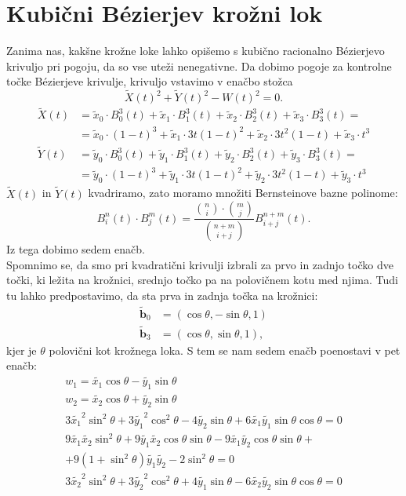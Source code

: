\documentclass[a4paper,11pt]{article}
\theoremstyle{definition}
\theoremstyle{plain}
\begin{document}
\section{Kubični B\'ezierjev krožni lok}


Zanima nas, kakšne krožne loke lahko opišemo s kubično racionalno B\'ezierjevo krivuljo pri pogoju, da so vse uteži nenegativne. Da dobimo pogoje za kontrolne točke B\'ezierjeve krivulje, krivuljo vstavimo v enačbo stožca
$$ \tilde{X}(t)^2+\tilde{Y}(t)^2-W(t)^2=0.$$
\begin{align*}
\tilde{X}(t) &= \tilde{x}_0\cdot B_0^3(t)+\tilde{x}_1\cdot B_1^3(t)+ \tilde{x}_2\cdot B_2^3(t) + \tilde{x}_3\cdot B_3^3(t) = \\
&= \tilde{x}_0\cdot (1-t)^3+\tilde{x}_1\cdot3t(1-t)^2+\tilde{x}_2\cdot3t^2(1-t)+\tilde{x}_3\cdot t^3 \\
\tilde{Y}(t) &=\tilde{y}_0\cdot B_0^3(t)+\tilde{y}_1\cdot B_1^3(t)+\tilde{y}_2\cdot B_2^3(t) + \tilde{y}_3\cdot B_3^3(t) = \\
&= \tilde{y}_0\cdot (1-t)^3+\tilde{y}_1\cdot3t(1-t)^2+\tilde{y}_2\cdot3t^2(1-t)+\tilde{y}_3\cdot t^3 
\end{align*}
$\tilde{X}(t)$ in $\tilde{Y}(t)$ kvadriramo, zato moramo množiti Bernsteinove bazne polinome:
$$B_i^n(t)\cdot B_j^m(t)=\frac{\binom{n}{i} \cdot \binom{m}{j}}{\binom{n+m}{i+j}}B_{i+j}^{n+m}(t).$$
Iz tega dobimo sedem enačb.\\
Spomnimo se, da smo pri kvadratični krivulji izbrali za prvo in zadnjo točko dve točki, ki ležita na krožnici, srednjo točko pa na polovičnem kotu med njima. Tudi tu lahko predpostavimo, da sta prva in zadnja točka na krožnici:
\begin{align*}
\boldsymbol{\tilde{b}}_0 &= (\cos \theta, -\sin \theta, 1)\\
\boldsymbol{\tilde{b}}_3 &= (\cos \theta, \sin \theta, 1),
\end{align*}
kjer je $\theta$ polovični kot krožnega loka.  S tem se nam sedem enačb poenostavi v pet enačb:
\begin{align*}
w_1 = \tilde{x_1}\cos{\theta} - \tilde{y_1} \sin{\theta}   \\
w_2 = \tilde{x_2}\cos{\theta} + \tilde{y_2} \sin{\theta}   \\
3\tilde{x_1}^2\sin^2{\theta} + 3\tilde{y_1}^2\cos^2{\theta} - 4\tilde{y_2} \sin{\theta}  + 6\tilde{x_1}\tilde{y_1} \sin{\theta} \cos{\theta} = 0 \\
9\tilde{x_1}\tilde{x_2}\sin^2{\theta} + 9\tilde{y_1}\tilde{x_2}\cos{\theta} \sin{\theta} - 9\tilde{x_1} \tilde{y_2} \cos{\theta} \sin{\theta}+ \\
+ 9 (1 + \sin^2{\theta}) \tilde{y_1} \tilde{y_2} - 2\sin^2{\theta} = 0 \\
3\tilde{x_2}^2 \sin^2{\theta}+ 3\tilde{y_2}^2 \cos^2{\theta}+ 4\tilde{y_1} \sin{\theta}  - 6\tilde{x_2}\tilde{y_2}\sin{\theta} \cos{\theta}  = 0 
\end{align*}
\end{document}
